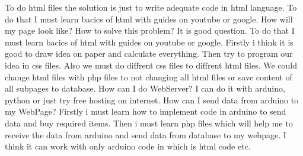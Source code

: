 To do html files the solution is just to write adequate code in html language. To do that I must learn bacics of html with guides on youtube or google. How will my page look like? How to solve this problem? It is good question. To do that I must learn bacics of html with guides on youtube or google. Firstly i think it is good to draw idea on paper and calculate everything. Then try to program our idea in css files. Also we must do diffrent css files to diffrent html files. We could change html files with php files to not changing all html files or save content of all subpages to database. \newline
How can I do WebServer? I can do it with arduino, python or just try free hosting on internet. \newline How can I send data from arduino to my WebPage? Firstly i must learn how to implement code in arduino to send data and buy required items. Then i must learn php files which will help me to receive the data from arduino and send data from database to my webpage. I think it can work with only arduino code in which is html code etc.\newline 